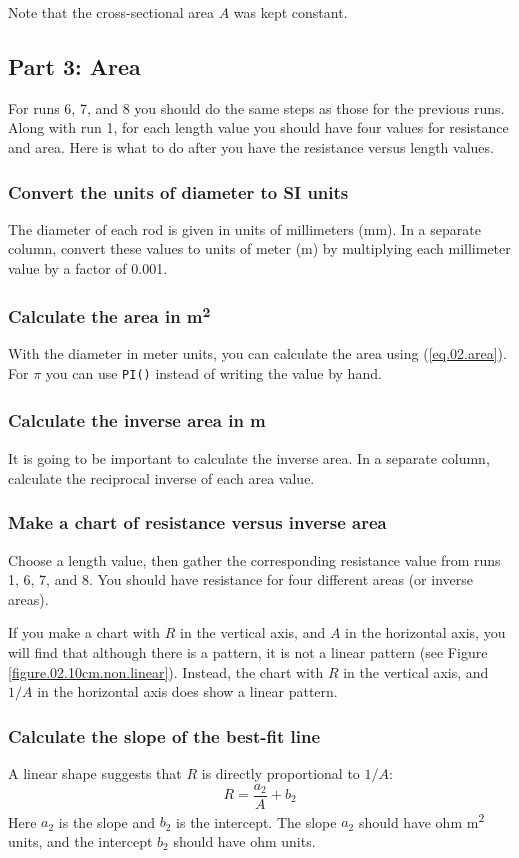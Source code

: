 Note that the cross-sectional area $A$ was kept constant.
%
\subsection{Part 3: Area}
%
For runs 6, 7, and 8 you should do the same steps as those for the previous runs. Along with run 1, for each length value you should have four values for resistance and area. Here is what to do after you have the resistance versus length values.
%
\subsubsection{Convert the units of diameter to SI units}
%
The diameter of each rod is given in units of millimeters (mm). In a separate column, convert these values to units of meter (m) by multiplying each millimeter value by a factor of 0.001.
%
\subsubsection{Calculate the area in m\textsuperscript{2}}
%
With the diameter in meter units, you can calculate the area using (\ref{eq.02.area}). For $\pi$ you can use \texttt{PI()} instead of writing the value by hand.
%
\subsubsection{Calculate the inverse area in m\textsuperscript{}}
%
It is going to be important to calculate the inverse area. In a separate column, calculate the reciprocal inverse of each area value.
%
\subsubsection{Make a chart of resistance versus inverse area}
%
Choose a length value, then gather the corresponding resistance value from runs 1, 6, 7, and 8. You should have resistance for four different areas (or inverse areas).

If you make a chart with $R$ in the vertical axis, and $A$ in the horizontal axis, you will find that although there is a pattern, it is not a linear pattern (see Figure \ref{figure.02.10cm.non.linear}). Instead, the chart with $R$ in the vertical axis, and $1/A$ in the horizontal axis does show a linear pattern.
%
\subsubsection{Calculate the slope of the best-fit line}
%
A linear shape suggests that $R$ is directly proportional to $1/A$:
\begin{equation}
	R = \frac{a_{2}}{A} + b_{2}
\end{equation}
Here $a_{2}$ is the slope and $b_{2}$ is the intercept. The slope $a_{2}$ should have ohm{ }\textperiodcentered{ }m\textsuperscript{2} units, and the intercept $b_{2}$ should have ohm units.

